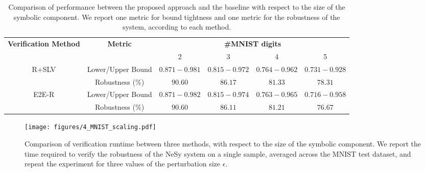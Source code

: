 \begin{table*}[t]  
    \renewcommand{\arraystretch}{1.1}
    \centering
    \begin{tabular}{cccccc}
         \hline \hline
         \multirow{2}{*}{\textbf{Verification Method}} & \multirow{2}{*}{\textbf{Metric}} & \multicolumn{4}{c}{\textbf{\#MNIST digits}} \\
         & & 2 & 3 & 4 & 5 \\
         \hline
         \multirow{2}{*}{\textsc{R+SLV}} & Lower/Upper Bound
                                               & $0.871-0.981$ & $0.815-0.972$ & $0.764-0.962$ & $0.731-0.928$ \\
                                               & Robustness (\%)         & $90.60$ & $86.17$ & $81.33$ & $78.31$ \\\hline
         \multirow{2}{*}{\textsc{E2E-R}}  & Lower/Upper Bound
                                               & $0.871-0.982$ & $0.815-0.974$ & $0.763-0.965$ & $0.716-0.958$ \\
                                               & Robustness (\%)         & $90.60$ & $86.11$ & $81.21$ & $76.67$ \\ \hline \hline
    \end{tabular}
    \caption{Comparison of performance between the proposed approach and the baseline with respect to the size of the symbolic component. We report one metric for bound tightness and one metric for the robustness of the system, according to each method.}
    \label{tab:mnist-perf}
\end{table*}

\begin{figure}[!h]
    \centering
    \texttt{[image: figures/4\_MNIST\_scaling.pdf]}
    \caption{Comparison of verification runtime between three methods, with respect to the size of the symbolic component. We report the time required to verify the robustness of the NeSy system on a single sample, averaged across the MNIST test dataset, and repeat the experiment for three values of the perturbation size $\epsilon$.}
    \label{fig:mnist-timing}
\end{figure}

